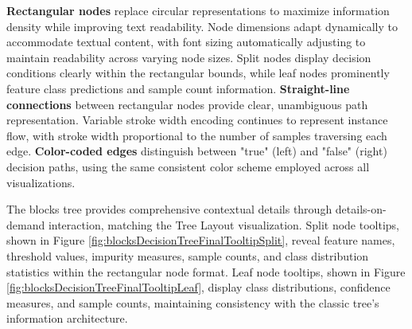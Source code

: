 \textbf{Rectangular nodes} replace circular representations to maximize information density while improving text readability. Node dimensions adapt dynamically to accommodate textual content, with font sizing automatically adjusting to maintain readability across varying node sizes. Split nodes display decision conditions clearly within the rectangular bounds, while leaf nodes prominently feature class predictions and sample count information.
% 
\textbf{Straight-line connections} between rectangular nodes provide clear, unambiguous path representation. Variable stroke width encoding continues to represent instance flow, with stroke width proportional to the number of samples traversing each edge. \textbf{Color-coded edges} distinguish between "true" (left) and "false" (right) decision paths, using the same consistent color scheme employed across all visualizations.

The blocks tree provides comprehensive contextual details through details-on-demand interaction, matching the Tree Layout visualization. Split node tooltips, shown in Figure \ref{fig:blocksDecisionTreeFinalTooltipSplit}, reveal feature names, threshold values, impurity measures, sample counts, and class distribution statistics within the rectangular node format. Leaf node tooltips, shown in Figure \ref{fig:blocksDecisionTreeFinalTooltipLeaf}, display class distributions, confidence measures, and sample counts, maintaining consistency with the classic tree's information architecture.

